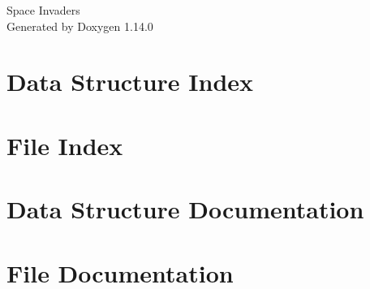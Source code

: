 \documentclass[twoside]{book}
\newcommand{\+}{\discretionary{\mbox{\scriptsize$\hookleftarrow$}}{}{}}
\newcommand{\clearemptydoublepage}{%
    \newpage{\pagestyle{empty}\cleardoublepage}%
  }
\begin{document}
  \raggedbottom
    \hypersetup{pageanchor=false,
                bookmarksnumbered=true,
                pdfencoding=unicode
               }
  \begin{titlepage}
  \vspace*{7cm}
  \begin{center}%
  {\Large Space Invaders}\\
  \vspace*{1cm}
  {\large Generated by Doxygen 1.14.0}\\
  \end{center}
  \end{titlepage}
  \clearemptydoublepage
  \tableofcontents
  \clearemptydoublepage
  \hypersetup{pageanchor=true}
\chapter{Data Structure Index}

\chapter{File Index}

\chapter{Data Structure Documentation}






\chapter{File Documentation}














  \backmatter
  \newpage
  \clearemptydoublepage
  \printindex
\end{document}
